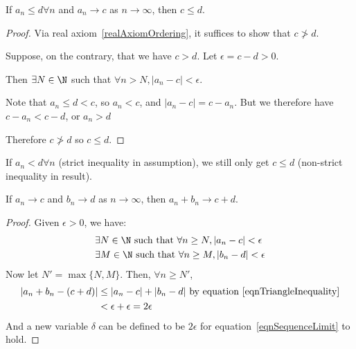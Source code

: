 \documentclass[../Main.tex]{subfiles}
\begin{document}
\begin{proposition}
    If $a_n \leq d \forall n$ and $a_n \rightarrow c$ as $n \rightarrow \infty$, then $c \leq d$.
    \label{propLimitLessThanBound}
\end{proposition}
\begin{proof}
    Via real axiom~\ref{realAxiomOrdering}, it suffices to show that $c \not > d$.\par
    Suppose, on the contrary, that we have $c > d$. Let $\epsilon = c - d > 0$.\par
    Then $\exists N \in \N$ such that $\forall n > N, |a_n - c| < \epsilon$.\par
    Note that $a_n \leq d < c$, so $a_n < c$, and $|a_n - c| = c - a_n$. But we therefore have $c - a_n < c - d$, or $a_n > d$\contradiction\par
    Therefore $c \not > d$ so $c \leq d$.
\end{proof}
\begin{remark}
    If $a_n < d \forall n$ (strict inequality in assumption), we still only get $c \leq d$ (non-strict inequality in result).
\end{remark}
\begin{proposition}
    If $a_n \rightarrow c$ and $b_n \rightarrow d$ as $n \rightarrow \infty$, then $a_n + b_n \rightarrow c + d$.
    \label{propSumSequences}
\end{proposition}
\begin{proof}
    Given $\epsilon > 0$, we have:
    \begin{align*}
        &\exists N \in \N \text{ such that } \forall n \geq N, |a_n - c| < \epsilon \\
        &\exists M \in \N \text{ such that } \forall n \geq M, |b_n - d| < \epsilon
    \end{align*}
    Now let $N' = \max{\{N, M\}}$. Then, $\forall n \geq N'$,
    \begin{align*}
        |a_n + b_n - (c + d)| &\leq |a_n - c| + |b_n - d| \text{ by equation~\ref{eqnTriangleInequality}} \\
        &< \epsilon + \epsilon = 2\epsilon
    \end{align*}
    And a new variable $\delta$ can be defined to be $2\epsilon$ for equation~\ref{eqnSequenceLimit} to hold.
\end{proof}
\end{document}
